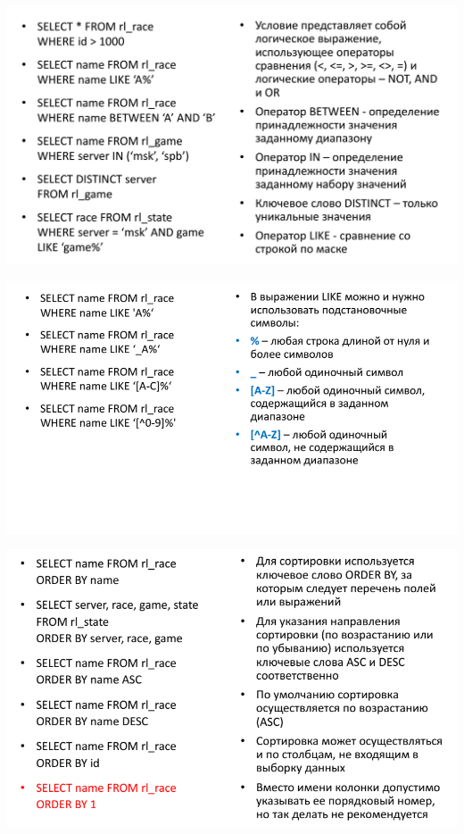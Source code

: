 \documentclass{beamer}
\begin{document}
\begin{frame}
\begin{center}
\includegraphics[scale=0.4]{images/sql-02.png}
\end{center}
\end{frame} 

\begin{frame}
\begin{center}
\includegraphics[scale=0.5]{images/sql-03.png}
\end{center}
\end{frame} 

\begin{frame}
\begin{center}
\includegraphics[scale=0.5]{images/sql-04.png}
\end{center}
\end{frame} 
\end{document}
